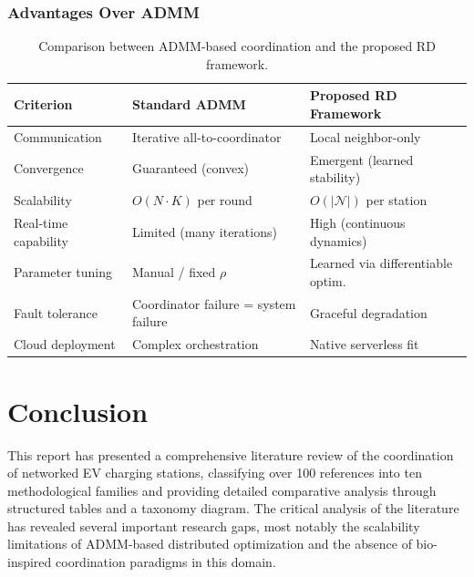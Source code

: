 \documentclass[review]{elsarticle}
\begin{document}
\subsubsection{Advantages Over ADMM}

\begin{table}[!htbp]
\centering
\caption{Comparison between ADMM-based coordination and the proposed RD framework.}
\label{tab:admm_vs_rd}
\footnotesize
\begin{tabular}{p{3.5cm}p{4.5cm}p{4.5cm}}
\toprule
\textbf{Criterion} & \textbf{Standard ADMM} & \textbf{Proposed RD Framework} \\
\midrule
Communication & Iterative all-to-coordinator & Local neighbor-only \\
Convergence & Guaranteed (convex) & Emergent (learned stability) \\
Scalability & $O(N \cdot K)$ per round & $O(|\mathcal{N}|)$ per station \\
Real-time capability & Limited (many iterations) & High (continuous dynamics) \\
Parameter tuning & Manual / fixed $\rho$ & Learned via differentiable optim. \\
Fault tolerance & Coordinator failure = system failure & Graceful degradation \\
Cloud deployment & Complex orchestration & Native serverless fit \\
\bottomrule
\end{tabular}
\end{table}



\section{Conclusion}\label{sec:conclusion}

\hspace{0.5cm}This report has presented a comprehensive literature review of the coordination of networked EV charging stations, classifying over 100 references into ten methodological families and providing detailed comparative analysis through structured tables and a taxonomy diagram. The critical analysis of the literature has revealed several important research gaps, most notably the scalability limitations of ADMM-based distributed optimization and the absence of bio-inspired coordination paradigms in this domain.
\end{document}
